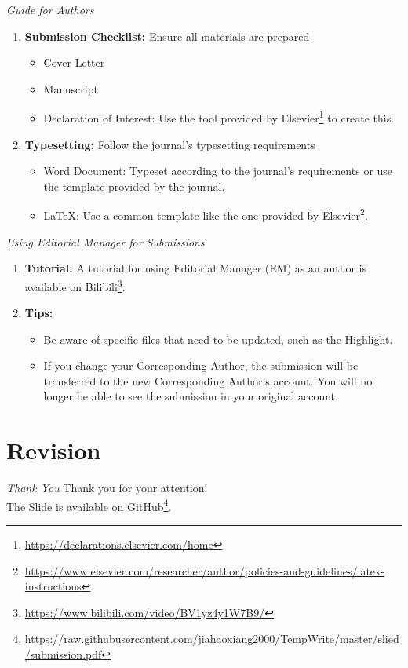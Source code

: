 \documentclass{beamer}
\begin{document}
\begin{frame}{\textit{Guide for Authors}}
    \begin{enumerate}
        \item \textbf{Submission Checklist:} Ensure all materials are prepared
              \begin{itemize}
                  \item Cover Letter
                  \item Manuscript
                  \item Declaration of Interest: Use the tool provided by Elsevier\footnote{\url{https://declarations.elsevier.com/home}} to create this.
              \end{itemize}
        \item \textbf{Typesetting:} Follow the journal's typesetting requirements
              \begin{itemize}
                  \item Word Document: Typeset according to the journal's requirements or use the template provided by the journal.
                  \item \LaTeX: Use a common template like the one provided by Elsevier\footnote{\url{https://www.elsevier.com/researcher/author/policies-and-guidelines/latex-instructions}}.
              \end{itemize}
    \end{enumerate}
\end{frame}

\begin{frame}{\textit{Using Editorial Manager for Submissions}}
    \begin{enumerate}
        \item \textbf{Tutorial:} A tutorial for using Editorial Manager (EM) as an author is available on Bilibili\footnote{\url{https://www.bilibili.com/video/BV1yz4y1W7B9/}}.
        \item \textbf{Tips:}
              \begin{itemize}
                  \item Be aware of specific files that need to be updated, such as the Highlight.
                  \item If you change your Corresponding Author, the submission will be transferred to the new Corresponding Author's account. You will no longer be able to see the submission in your original account.
              \end{itemize}
    \end{enumerate}
\end{frame}

\section{Revision}




\begin{frame}{\textit{Thank You}}
    \centering
    \Large
    Thank you for your attention! \\
    \normalsize
    The Slide is available on GitHub{\footnotesize\footnote{\url{https://raw.githubusercontent.com/jiahaoxiang2000/TempWrite/master/slied/submission.pdf}}}.
\end{frame}
\end{document}
